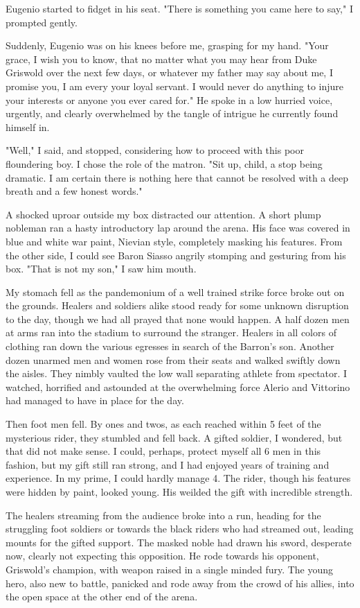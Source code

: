 \documentclass{article}
\begin{document}
Eugenio started to fidget in his seat. "There is something you came here to say," I prompted gently.

Suddenly, Eugenio was on his knees before me, grasping for my hand. "Your grace, I wish you to know, that no matter what you may hear from Duke Griswold over the next few days, or whatever my father may say about me, I promise you, I am every your loyal servant. I would never do anything to injure your interests or anyone you ever cared for." He spoke in a low hurried voice, urgently, and clearly overwhelmed by the tangle of intrigue he currently found himself in.

"Well," I said, and stopped, considering how to proceed with this poor floundering boy. I chose the role of the matron. "Sit up, child, a stop being dramatic. I am certain there is nothing here that cannot be resolved with a deep breath and a few honest words."

A shocked uproar outside my box distracted our attention. A short plump nobleman ran a hasty introductory lap around the arena. His face was covered in blue and white war paint, Nievian style, completely masking his features. From the other side, I could see Baron Siasso angrily stomping and gesturing from his box. "That is not my son," I saw him mouth.

My stomach fell as the pandemonium of a well trained strike force broke out on the grounds. Healers and soldiers alike stood ready for some unknown disruption to the day, though we had all prayed that none would happen. A half dozen men at arms ran into the stadium to surround the stranger. Healers in all colors of clothing ran down the various egresses in search of the Barron's son. Another dozen unarmed men and women rose from their seats and walked swiftly down the aisles. They nimbly vaulted the low wall separating athlete from spectator. I watched, horrified and astounded at the overwhelming force Alerio and Vittorino had managed to have in place for the day.

Then foot men fell. By ones and twos, as each reached within 5 feet of the mysterious rider, they stumbled and fell back. A gifted soldier, I wondered, but that did not make sense. I could, perhaps, protect myself all 6 men in this fashion, but my gift still ran strong, and I had enjoyed years of training and experience. In my prime, I could hardly manage 4. The rider, though his features were hidden by paint, looked young. His weilded the gift with incredible strength.

The healers streaming from the audience broke into a run, heading for the struggling foot soldiers or towards the black riders who had streamed out, leading mounts for the gifted support. The masked noble had drawn his sword, desperate now, clearly not expecting this opposition. He rode towards his opponent, Griswold's champion, with weapon raised in a single minded fury. The young hero, also new to battle, panicked and rode away from the crowd of his allies, into the open space at the other end of the arena.
\end{document}
